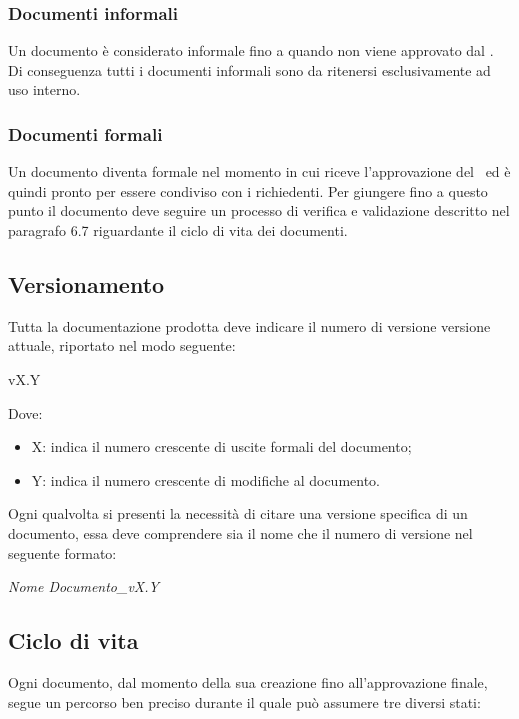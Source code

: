 \subsubsection{Documenti informali}
Un documento è considerato informale fino a quando non viene approvato dal \ruoloResponsabile. Di conseguenza tutti i documenti informali sono da ritenersi esclusivamente ad uso interno.

\subsubsection{Documenti formali}
Un documento diventa formale nel momento in cui riceve l'approvazione del \ruoloResponsabile\ ed è quindi pronto per essere condiviso con i richiedenti.
Per giungere fino a questo punto il documento deve seguire un processo di verifica e validazione descritto nel paragrafo 6.7 riguardante il ciclo di vita dei documenti.

\subsection{Versionamento}
Tutta la documentazione prodotta deve indicare il numero di versione versione attuale, riportato nel modo seguente:
\begin{center}
vX.Y
\end{center}
Dove:
\begin{itemize}
\item X: indica il numero crescente di uscite formali del documento;
\item Y: indica il numero crescente di modifiche al documento.
\end{itemize}
Ogni qualvolta si presenti la necessità di citare una versione specifica di un documento, essa
deve comprendere sia il nome che il numero di versione nel seguente formato:
\begin{center}
\textit{Nome Documento\_vX.Y}
\end{center}

\subsection{Ciclo di vita}
Ogni documento, dal momento della sua creazione fino all'approvazione finale, segue un percorso ben preciso durante il quale può assumere tre diversi stati:


